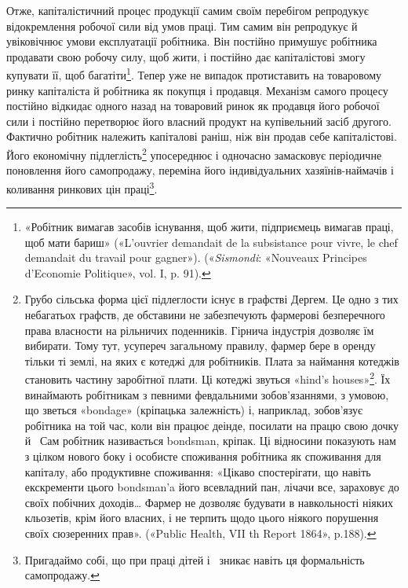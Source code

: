 Отже, капіталістичний процес продукції самим своїм перебігом
репродукує відокремлення робочої сили від умов праці.
Тим самим він репродукує й увіковічнює умови експлуатації
робітника. Він постійно примушує робітника продавати свою
робочу силу, щоб жити, і постійно дає капіталістові змогу купувати
її, щоб багатіти\footnote{
«Робітник вимагав засобів існування, щоб жити, підприємець
вимагав праці, щоб мати бариш» («L’ouvrier demandait de la subsistance
pour vivre, le chef demandait du travail pour gagner»). («\emph{Sismondi}: «Nouveaux
Principes d’Economie Politique», vol. I, p. 91).
}. Тепер уже не випадок протиставить на
товаровому ринку капіталіста й робітника як покупця і продавця.
Механізм самого процесу постійно відкидає одного назад на
товаровий ринок як продавця його робочої сили і постійно перетворює
його власний продукт на купівельний засіб другого.
Фактично робітник належить капіталові раніш, ніж він продав
себе капіталістові. Його економічну підлеглість\footnote{
Грубо сільська форма цієї підлеглости існує в графстві Дергем.
Це одно з тих небагатьох графств, де обставини не забезпечують фармерові
безперечного права власности на рільничих поденників. Гірнича
індустрія дозволяє їм вибирати. Тому тут, усупереч загальному правилу,
фармер бере в оренду тільки ті землі, на яких є котеджі для робітників.
Плата за наймання котеджів становить частину заробітної плати. Ці котеджі
звуться «hind’s houses»\footnote*{
доми слуг. \emph{Ред.}
}. Їх винаймають робітникам з певними февдальними
зобов’язаннями, з умовою, що зветься «bondage» (кріпацька
залежність) і, наприклад, зобов’язує робітника на той час, коли він працює
деінде, посилати на працю свою дочку й~ Сам робітник називається
bondsman, кріпак. Ці відносини показують нам з цілком нового
боку і особисте споживання робітника як споживання для капіталу, або
продуктивне споживання: «Цікаво спостерігати, що навіть екскременти
цього bondsman’a його всевладний пан, лічачи все, зараховує до своїх побічних
доходів\dots{} Фармер не дозволяє будувати в навкольності ніяких кльозетів,
крім його власних, і не терпить щодо цього ніякого порушення своїх сюзеренних
прав». («Public Health, VII th Report 1864», p.188).
} упосереднює
і одночасно замасковує періодичне поновлення його самопродажу,
переміна його індивідуальних хазяїнів-наймачів і коливання
ринкових цін праці\footnote{
Пригадаймо собі, що при праці дітей і~ зникає навіть ця формальність
самопродажу.
}.

